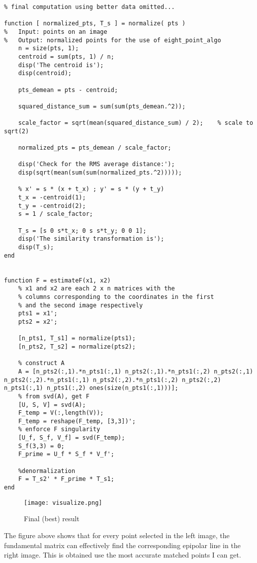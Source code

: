\begin{questions}
\begin{parts}
\begin{lstlisting}
% final computation using better data omitted...

function [ normalized_pts, T_s ] = normalize( pts )
%   Input: points on an image
%   Output: normalized points for the use of eight_point_algo
    n = size(pts, 1);
    centroid = sum(pts, 1) / n;
    disp('The centroid is');
    disp(centroid);
    
    pts_demean = pts - centroid;
    
    squared_distance_sum = sum(sum(pts_demean.^2));
    
    scale_factor = sqrt(mean(squared_distance_sum) / 2);    % scale to sqrt(2)
    
    normalized_pts = pts_demean / scale_factor;
    
    disp('Check for the RMS average distance:');
    disp(sqrt(mean(sum(sum(normalized_pts.^2)))));
    
    % x' = s * (x + t_x) ; y' = s * (y + t_y)
    t_x = -centroid(1);
    t_y = -centroid(2);
    s = 1 / scale_factor;
    
    T_s = [s 0 s*t_x; 0 s s*t_y; 0 0 1];
    disp('The similarity transformation is');
    disp(T_s);
end


function F = estimateF(x1, x2)
    % x1 and x2 are each 2 x n matrices with the 
    % columns corresponding to the coordinates in the first
    % and the second image respectively
    pts1 = x1';
    pts2 = x2';
    
    [n_pts1, T_s1] = normalize(pts1);
    [n_pts2, T_s2] = normalize(pts2);
    
    % construct A
    A = [n_pts2(:,1).*n_pts1(:,1) n_pts2(:,1).*n_pts1(:,2) n_pts2(:,1) n_pts2(:,2).*n_pts1(:,1) n_pts2(:,2).*n_pts1(:,2) n_pts2(:,2) n_pts1(:,1) n_pts1(:,2) ones(size(n_pts1(:,1)))];
    % from svd(A), get F
    [U, S, V] = svd(A);
    F_temp = V(:,length(V));
    F_temp = reshape(F_temp, [3,3])';
    % enforce F singularity
    [U_f, S_f, V_f] = svd(F_temp);
    S_f(3,3) = 0;
    F_prime = U_f * S_f * V_f';
    
    %denormalization
    F = T_s2' * F_prime * T_s1;
end
        \end{lstlisting}
    
    \begin{figure}[H]
    \centering
    \texttt{[image: visualize.png]}
    \caption{Final (best) result}
    \end{figure}
    The figure above shows that for every point selected in the left image, the fundamental matrix can effectively find the corresponding epipolar line in the right image. This is obtained use the most accurate matched points I can get.
\end{parts}
\end{questions}